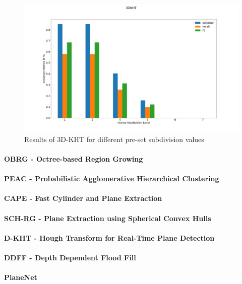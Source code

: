 \documentclass[main.tex]{subfiles}
\begin{document}
\begin{figure}[H]
    \centering
    \includegraphics[width=15 cm]{images/params_3dkht.png}
    \caption[3D-KHT Parameter Benchmark Results]{Results of 3D-KHT for different pre-set subdivision values}
    \label{fig:3dkht_params}
\end{figure}

\paragraph{OBRG - Octree-based Region Growing}
\paragraph{PEAC - Probabilistic Agglomerative Hierarchical Clustering}
\paragraph{CAPE - Fast Cylinder and Plane Extraction}
\paragraph{SCH-RG - Plane Extraction using Spherical Convex Hulls}
\paragraph{D-KHT - Hough Transform for Real-Time Plane Detection}
\paragraph{DDFF - Depth Dependent Flood Fill}
\paragraph{PlaneNet}
\end{document}
